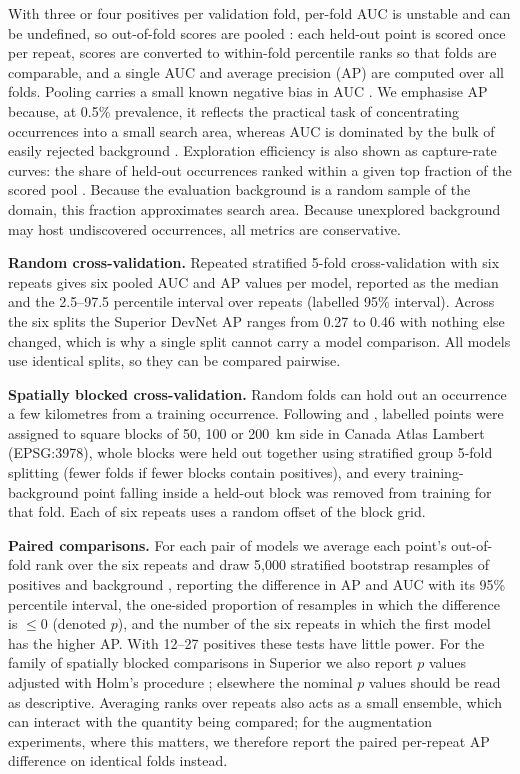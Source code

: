 \documentclass[pdflatex,sn-apa]{sn-jnl}
\begin{document}
With three or four positives per validation fold, per-fold AUC is unstable and can be undefined, so out-of-fold scores are pooled \citep{BradleyAP1997}: each held-out point is scored once per repeat, scores are converted to within-fold percentile ranks so that folds are comparable, and a single AUC and average precision (AP) are computed over all folds. Pooling carries a small known negative bias in AUC \citep{Airola2019,Parker2007}. We emphasise AP because, at 0.5\% prevalence, it reflects the practical task of concentrating occurrences into a small search area, whereas AUC is dominated by the bulk of easily rejected background \citep{Saito2015}. Exploration efficiency is also shown as capture-rate curves: the share of held-out occurrences ranked within a given top fraction of the scored pool \citep{Chung2003,Agterberg2005}. Because the evaluation background is a random sample of the domain, this fraction approximates search area. Because unexplored background may host undiscovered occurrences, all metrics are conservative.

\textbf{Random cross-validation.} Repeated stratified 5-fold cross-validation with six repeats gives six pooled AUC and AP values per model, reported as the median and the 2.5--97.5 percentile interval over repeats (labelled 95\% interval). Across the six splits the Superior DevNet AP ranges from 0.27 to 0.46 with nothing else changed, which is why a single split cannot carry a model comparison. All models use identical splits, so they can be compared pairwise.

\textbf{Spatially blocked cross-validation.} Random folds can hold out an occurrence a few kilometres from a training occurrence. Following \citet{Roberts2017} and \citet{Valavi2019}, labelled points were assigned to square blocks of 50, 100 or 200~km side in Canada Atlas Lambert (EPSG:3978), whole blocks were held out together using stratified group 5-fold splitting (fewer folds if fewer blocks contain positives), and every training-background point falling inside a held-out block was removed from training for that fold. Each of six repeats uses a random offset of the block grid.

\textbf{Paired comparisons.} For each pair of models we average each point's out-of-fold rank over the six repeats and draw 5,000 stratified bootstrap resamples of positives and background \citep{Efron1993}, reporting the difference in AP and AUC with its 95\% percentile interval, the one-sided proportion of resamples in which the difference is $\leq 0$ (denoted $p$), and the number of the six repeats in which the first model has the higher AP. With 12--27 positives these tests have little power. For the family of spatially blocked comparisons in Superior we also report $p$ values adjusted with Holm's procedure \citep{Holm1979}; elsewhere the nominal $p$ values should be read as descriptive. Averaging ranks over repeats also acts as a small ensemble, which can interact with the quantity being compared; for the augmentation experiments, where this matters, we therefore report the paired per-repeat AP difference on identical folds instead.
\end{document}
